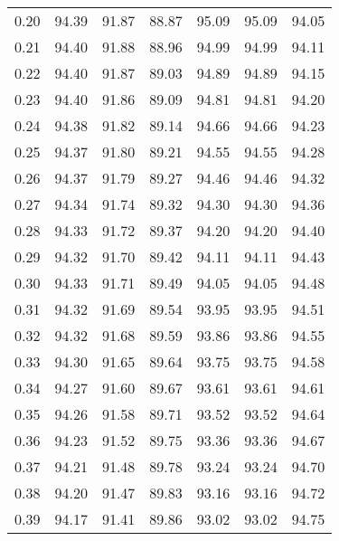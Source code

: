 \begin{tabular}{|c|c|c|c|c|c|c|}
      0.20 &     94.39 &     91.87 &      88.87 &   95.09 &      95.09 &         94.05 \\
      0.21 &     94.40 &     91.88 &      88.96 &   94.99 &      94.99 &         94.11 \\
      0.22 &     94.40 &     91.87 &      89.03 &   94.89 &      94.89 &         94.15 \\
      0.23 &     94.40 &     91.86 &      89.09 &   94.81 &      94.81 &         94.20 \\
      0.24 &     94.38 &     91.82 &      89.14 &   94.66 &      94.66 &         94.23 \\
      0.25 &     94.37 &     91.80 &      89.21 &   94.55 &      94.55 &         94.28 \\
      0.26 &     94.37 &     91.79 &      89.27 &   94.46 &      94.46 &         94.32 \\
      0.27 &     94.34 &     91.74 &      89.32 &   94.30 &      94.30 &         94.36 \\
      0.28 &     94.33 &     91.72 &      89.37 &   94.20 &      94.20 &         94.40 \\
      0.29 &     94.32 &     91.70 &      89.42 &   94.11 &      94.11 &         94.43 \\
      0.30 &     94.33 &     91.71 &      89.49 &   94.05 &      94.05 &         94.48 \\
      0.31 &     94.32 &     91.69 &      89.54 &   93.95 &      93.95 &         94.51 \\
      0.32 &     94.32 &     91.68 &      89.59 &   93.86 &      93.86 &         94.55 \\
      0.33 &     94.30 &     91.65 &      89.64 &   93.75 &      93.75 &         94.58 \\
      0.34 &     94.27 &     91.60 &      89.67 &   93.61 &      93.61 &         94.61 \\
      0.35 &     94.26 &     91.58 &      89.71 &   93.52 &      93.52 &         94.64 \\
      0.36 &     94.23 &     91.52 &      89.75 &   93.36 &      93.36 &         94.67 \\
      0.37 &     94.21 &     91.48 &      89.78 &   93.24 &      93.24 &         94.70 \\
      0.38 &     94.20 &     91.47 &      89.83 &   93.16 &      93.16 &         94.72 \\
      0.39 &     94.17 &     91.41 &      89.86 &   93.02 &      93.02 &         94.75 \\

\end{tabular}
